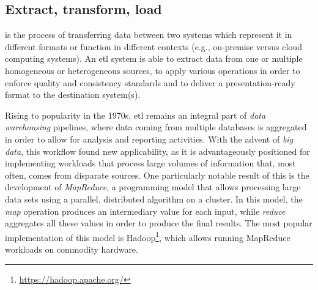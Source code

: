 \subsection{Extract, transform, load}
\label{sec:etl}

 is the process of transferring data between two systems which represent it in different formats or function in different contexts (e.g., on-premise versus cloud computing systems). An \gls{etl} system is able to extract data from one or multiple homogeneous or heterogeneous sources, to apply various operations in order to enforce quality and consistency standards and to deliver a presentation-ready format to the destination system(s).

Rising to popularity in the 1970s, \gls{etl} remains an integral part of \emph{data warehousing} pipelines, where data coming from multiple databases is aggregated in order to allow for analysis and reporting activities. With the advent of \emph{big data}, this workflow found new applicability, as it is advantageously positioned for implementing workloads that process large volumes of information that, most often, comes from disparate sources. One particularly notable result of this is the development of \emph{MapReduce}, a programming model that allows processing large data sets using a parallel, distributed algorithm on a cluster. In this model, the \emph{map} operation produces an intermediary value for each input, while \emph{reduce} aggregates all these values in order to produce the final results. The most popular implementation of this model is Hadoop\footnote{\url{https://hadoop.apache.org/}}, which allows running MapReduce workloads on commodity hardware.



